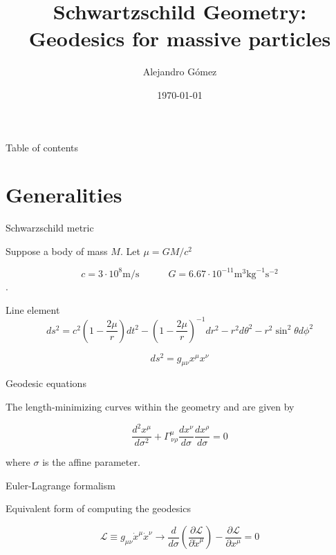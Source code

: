 \documentclass[xcolor=dvipsnames]{beamer}
\title[Schwartzschild geometry]{Schwartzschild Geometry: Geodesics for massive particles}
\date{\today}
\author[Universidad del Valle]{Alejandro Gómez }
\institute[]{Universidad del Valle \\ Departamento de física}
\begin{document}
	
	\begin{frame}
		\titlepage
	\end{frame}
	
	\begin{frame}{Table of contents}
    \tableofcontents
	\end{frame}
	
	
\section{Generalities}

\begin{frame}{Schwarzschild metric}

Suppose a body of mass $M$. Let $\mu = GM/c^2$

$$c = 3\cdot 10^8 \text{m/s} \qquad \quad G = 6.67 \cdot 10^{-11} \text{m}^3 \text{kg}^{-1} \text{s}^{-2}$$.

\begin{block}{Line element}
\begin{equation*}
	ds^2 = c^2 \left( 1 - \frac{2\mu}{r}\right) dt^2 - \left( 1 - \frac{2\mu}{r}\right)^{-1} dr^2 - r^2 d\theta^2 - r^2 \sin^2 \theta d\phi^2
\end{equation*}
\end{block}

\begin{equation*}
    ds^2 = g_{\mu \nu} x^\mu x^\nu
\end{equation*}

\end{frame}


\begin{frame}{Geodesic equations}

The length-minimizing curves within the geometry and are given by

\begin{equation*}
    \frac{d^2 x^\mu}{d\sigma^2} + \Gamma^\mu_{\, \nu \rho} \frac{dx^\nu}{d\sigma} \frac{dx^\rho}{d\sigma} = 0
\end{equation*}

where $\sigma$ is the affine parameter.

\begin{block}{Euler-Lagrange formalism}

Equivalent form of computing the geodesics

\begin{equation*}
	\mathcal{L} \equiv g_{\mu \nu} \dot{x}^\mu \dot{x}^\nu  \longrightarrow \frac{d}{d\sigma} \left( \frac{\partial \mathcal{L}}{\partial \dot{x}^\mu} \right) - \frac{\partial \mathcal{L}}{\partial x^\mu} = 0
\end{equation*}
\end{block}

\end{frame}
\end{document}
